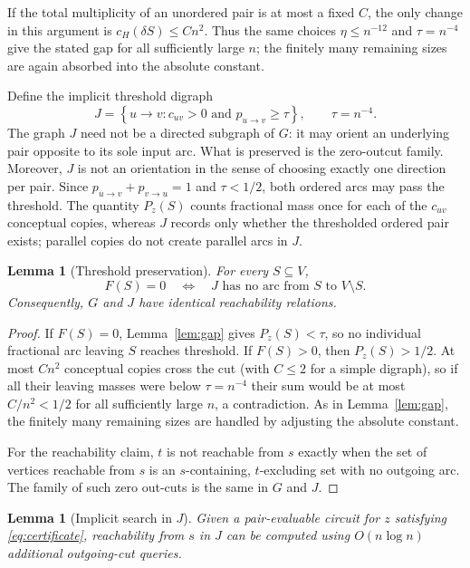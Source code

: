 \documentclass[11pt]{article}
\newtheorem{lemma}[theorem]{Lemma}
\theoremstyle{definition}
\newcommand{\cH}{c_H}
\newcommand{\set}[1]{\left\{#1\right\}}
\begin{document}
If the total multiplicity of an unordered pair is at most a fixed $C$, the
only change in this argument is
$\cH(\delta S)\le Cn^2$.  Thus the same choices
$\eta\le n^{-12}$ and $\tau=n^{-4}$ give the stated gap for all sufficiently
large $n$; the finitely many remaining sizes are again absorbed into the
absolute constant.

Define the implicit threshold digraph
\begin{equation}\label{eq:threshold-graph}
 J=\set{u\to v:c_{uv}>0\text{ and }p_{u\to v}\ge\tau},
 \qquad \tau=n^{-4}.
\end{equation}
The graph $J$ need not be a directed subgraph of $G$: it may orient an
underlying pair opposite to its sole input arc.  What is preserved is the
zero-outcut family.  Moreover, $J$ is not an orientation in the sense of
choosing exactly one direction per pair.  Since
$p_{u\to v}+p_{v\to u}=1$ and $\tau<1/2$, both ordered arcs may pass the
threshold.  The quantity $P_z(S)$ counts fractional mass once for each of
the $c_{uv}$ conceptual copies, whereas $J$ records only whether the
thresholded ordered pair exists; parallel copies do not create parallel arcs
in $J$.

\begin{lemma}[Threshold preservation]\label{lem:threshold}
For every $S\subseteq V$,
\[
 F(S)=0
 \quad\Longleftrightarrow\quad
 J\text{ has no arc from }S\text{ to }V\setminus S.
\]
Consequently, $G$ and $J$ have identical reachability relations.
\end{lemma}

\begin{proof}
If $F(S)=0$, Lemma~\ref{lem:gap} gives $P_z(S)<\tau$, so no individual
fractional arc leaving $S$ reaches threshold.  If $F(S)>0$, then
$P_z(S)>1/2$.  At most $Cn^2$ conceptual copies cross the cut (with
$C\le2$ for a simple digraph), so if all their leaving masses were below
$\tau=n^{-4}$ their sum would be at most $C/n^2<1/2$ for all sufficiently
large $n$, a contradiction.  As in Lemma~\ref{lem:gap}, the finitely many
remaining sizes are handled by adjusting the absolute constant.

For the reachability claim, $t$ is not reachable from $s$ exactly when the
set of vertices reachable from $s$ is an $s$-containing, $t$-excluding set
with no outgoing arc.  The family of such zero out-cuts is the same in $G$
and $J$.
\end{proof}

\begin{lemma}[Implicit search in $J$]\label{lem:implicit-bfs}
Given a pair-evaluable circuit for $z$ satisfying \eqref{eq:certificate},
reachability from $s$ in $J$ can be computed using $O(n\log n)$ additional
outgoing-cut queries.
\end{lemma}
\end{document}
